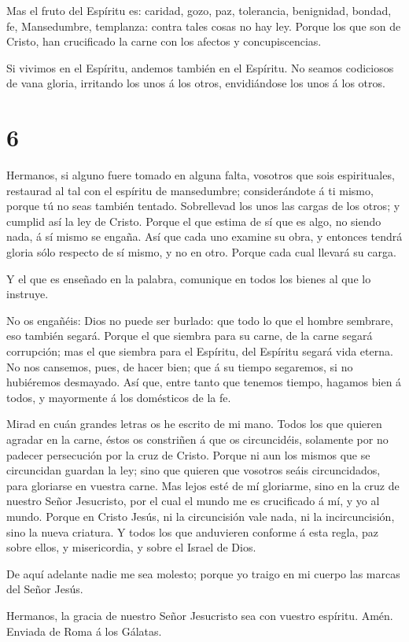  Mas el fruto del Espíritu es: caridad, gozo, paz,
tolerancia, benignidad, bondad, fe,  Mansedumbre,
templanza: contra tales cosas no hay ley.  Porque los que
son de Cristo, han crucificado la carne con los afectos y
concupiscencias.

 Si vivimos en el Espíritu, andemos también en el Espíritu.
 No seamos codiciosos de vana gloria, irritando los unos á
los otros, envidiándose los unos á los otros.

\hypertarget{section-5}{%
\section{6}\label{section-5}}

 Hermanos, si alguno fuere tomado en alguna falta, vosotros
que sois espirituales, restaurad al tal con el espíritu de mansedumbre;
considerándote á ti mismo, porque tú no seas también tentado.
 Sobrellevad los unos las cargas de los otros; y cumplid así
la ley de Cristo.  Porque el que estima de sí que es algo,
no siendo nada, á sí mismo se engaña.  Así que cada uno
examine su obra, y entonces tendrá gloria sólo respecto de sí mismo, y
no en otro.  Porque cada cual llevará su carga.

 Y el que es enseñado en la palabra, comunique en todos los
bienes al que lo instruye.

 No os engañéis: Dios no puede ser burlado: que todo lo que
el hombre sembrare, eso también segará.  Porque el que
siembra para su carne, de la carne segará corrupción; mas el que siembra
para el Espíritu, del Espíritu segará vida eterna.  No nos
cansemos, pues, de hacer bien; que á su tiempo segaremos, si no
hubiéremos desmayado.  Así que, entre tanto que tenemos
tiempo, hagamos bien á todos, y mayormente á los domésticos de la fe.

 Mirad en cuán grandes letras os he escrito de mi mano.
 Todos los que quieren agradar en la carne, éstos os
constriñen á que os circuncidéis, solamente por no padecer persecución
por la cruz de Cristo.  Porque ni aun los mismos que se
circuncidan guardan la ley; sino que quieren que vosotros seáis
circuncidados, para gloriarse en vuestra carne.  Mas lejos
esté de mí gloriarme, sino en la cruz de nuestro Señor Jesucristo, por
el cual el mundo me es crucificado á mí, y yo al mundo. 
Porque en Cristo Jesús, ni la circuncisión vale nada, ni la
incircuncisión, sino la nueva criatura.  Y todos los que
anduvieren conforme á esta regla, paz sobre ellos, y misericordia, y
sobre el Israel de Dios.

 De aquí adelante nadie me sea molesto; porque yo traigo en
mi cuerpo las marcas del Señor Jesús.

 Hermanos, la gracia de nuestro Señor Jesucristo sea con
vuestro espíritu. Amén. Enviada de Roma á los Gálatas.
